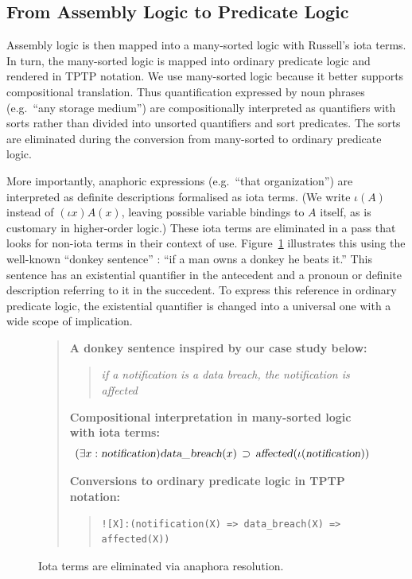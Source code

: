 \documentclass{IOS-Book-Article}
\newcommand{\eop}[1]{\mbox{\textsl{#1}}}
\newcommand{\bequ}{\begin{quote}}
\newcommand{\enqu}{\end{quote}}
\begin{document}
\subsection{From Assembly Logic to Predicate Logic}
\label{sec:predicate-logic}

Assembly logic is then mapped into a many-sorted logic with Russell's iota terms. In turn, the many-sorted logic is mapped into ordinary predicate logic and rendered in TPTP \cite{sutcliffe2009tptp} notation. 
We use many-sorted logic because it better supports compositional translation.
Thus quantification expressed by noun phrases (e.g.\ ``any storage medium'') are compositionally interpreted as quantifiers with sorts rather than divided into unsorted quantifiers and sort predicates.
The sorts are eliminated during the conversion from many-sorted to ordinary predicate logic.

More importantly, anaphoric expressions (e.g.\ ``that organization'') are interpreted as definite descriptions formalised as iota terms. (We write $\iota(A)$ instead of $(\iota x)A(x)$, leaving possible variable bindings to $A$ itself, as is customary in higher-order logic.)
These iota terms are eliminated in a pass that looks for non-iota terms in their context of use.
Figure~\ref{anaphora} illustrates this using the well-known ``donkey sentence'' \cite{geach-1962,kamp-1981}: ``if a man owns a donkey he beats it.''
This sentence has an existential quantifier in the antecedent and a pronoun or definite description referring to it in the succedent.
To express this reference in ordinary predicate logic, the existential quantifier is changed into a universal one with a wide scope of implication.

\begin{figure}
  \begin{framed}
  \bequ
    \textbf{A donkey sentence inspired by our case study below:}
    \bequ
        \textit{if a notification is a data breach, the notification is affected}
    \enqu

    \textbf{Compositional interpretation in many-sorted logic with iota terms:}
\[
(\exists x : \eop{notification})\eop{data\_breach}(x) \, \supset \, \eop{affected}(\iota(\eop{notification}))
\]

    \textbf{Conversions to ordinary predicate logic in TPTP notation:}
    \bequ
        \begin{verbatim}
![X]:(notification(X) => data_breach(X) => affected(X))
        \end{verbatim}
    \enqu
    \enqu
    \end{framed}
 \caption{Iota terms are eliminated via anaphora resolution.}
\label{anaphora}
\end{figure}
\end{document}
